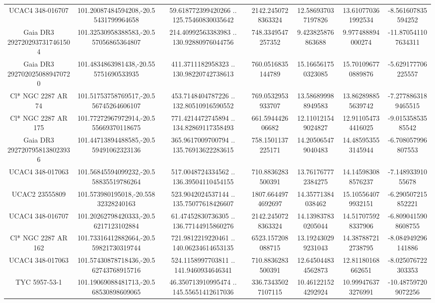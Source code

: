 \begin{table}
\begin{tabular}{ccccccc}
UCAC4 348-016707 & 101.20087484594208,-20.55431799964658 & 59.618772399420266 .. 125.75460830035642 & 2142.2450728363324 & 12.586937037197826 & 13.610770361992534 & -8.561607835594252 \\
Gaia DR3 2927202937317461504 & 101.32530958388583,-20.557056865364807 & 214.40992563383983 .. 130.92880976044756 & 748.3349547257352 & 9.423825876863688 & 9.977488894000274 & -11.870541107634311 \\
Gaia DR3 2927020250889470720 & 101.4834863981438,-20.555751690533935 & 411.3711182958323 .. 130.98220742738613 & 760.0516835144789 & 15.166561750323085 & 15.701096770889876 & -5.629177706225557 \\
Cl* NGC 2287     AR      74 & 101.51753758769517,-20.556745264606107 & 453.7148404787226 .. 132.80510916590552 & 769.0532953933707 & 13.586899988949583 & 13.862898855639742 & -7.2778863189465515 \\
Cl* NGC 2287     AR     175 & 101.77272967972914,-20.555669370118675 & 771.4214472745894 .. 134.82869117358493 & 661.594442606682 & 12.110121549024827 & 12.911054734416025 & -9.01535853585542 \\
Gaia DR3 2927207958138023936 & 101.44713894488585,-20.559491062323136 & 365.9617009700794 .. 135.76913622283615 & 758.1501137225171 & 14.205065479040483 & 14.485953553145944 & -6.708057996807553 \\
UCAC4 348-017063 & 101.56845594099232,-20.558835519786264 & 517.0048724334562 .. 136.39504110454155 & 710.8836283500391 & 13.761767772384275 & 14.145983088576237 & -7.14893391055678 \\
UCAC2  23555809 & 101.573980195018,-20.55832328240163 & 523.9042024537144 .. 135.75077618426607 & 1807.6644974692697 & 14.35771384038462 & 15.105564079932151 & -6.290507215852221 \\
UCAC4 348-016707 & 101.20262798420333,-20.56217123102884 & 61.47452830736305 .. 136.77144915860276 & 2142.2450728363324 & 14.139837830205044 & 14.517075928337906 & -6.8090415908608755 \\
Cl* NGC 2287     AR     162 & 101.73316412882664,-20.559821730319744 & 721.9812219220461 .. 140.06234614653135 & 6523.157208088715 & 13.192430299231043 & 14.387887212738795 & -8.084949296141886 \\
UCAC4 348-017063 & 101.57430878718436,-20.562743768915716 & 524.1158997703811 .. 141.9460934646341 & 710.8836283500391 & 12.645044834562873 & 12.81180168662651 & -8.025076722303353 \\
TYC 5957-53-1 & 101.19069088481713,-20.568530898609065 & 46.350713910995474 .. 145.55651412617036 & 336.73435027107115 & 10.461221524292924 & 10.999476373276991 & -10.487597209072256 \\

\end{tabular}
\end{table}
